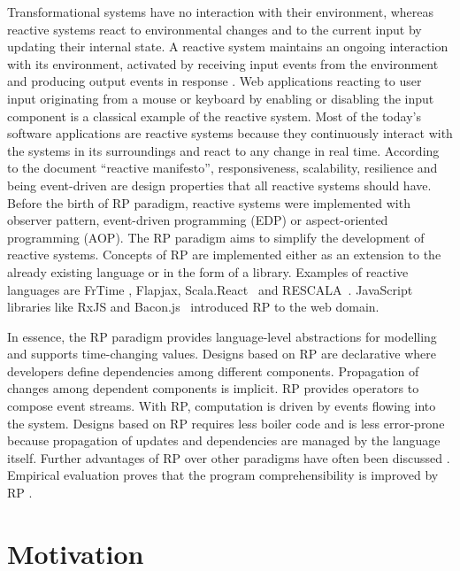 Transformational systems have no interaction with their environment, whereas reactive systems react to environmental changes and to the current input by updating their internal state. A reactive system maintains an ongoing interaction with its environment, activated by receiving input events from the environment and producing output events in response \cite{674156}. Web applications reacting to user input originating from a mouse or keyboard by enabling or disabling the input component is a classical example of the reactive system. 
Most of the today's software applications are reactive systems because they continuously interact with the systems in its surroundings and react to any change in real time. According to the document ``reactive manifesto''\cite{reactiveManifesto}, responsiveness, scalability, resilience and being event-driven are design properties that all reactive systems should have. 
Before the birth of RP paradigm, reactive systems were implemented with observer pattern, event-driven programming (EDP) or aspect-oriented programming (AOP).
The RP paradigm aims to simplify the development of reactive systems.
Concepts of RP are implemented either as an extension to the already existing language or in the form of a library. Examples of reactive languages are FrTime \cite{Cooper2006}, Flapjax\cite{Meyerovich:2009:FPL:1639949.1640091}, Scala.React~\cite{EPFL-REPORT-176887} and RESCALA~\cite{Salvaneschi:2014:RBO:2577080.2577083}. JavaScript libraries like RxJS\cite{reactivex} and Bacon.js~\cite{BaconJs} introduced RP to the web domain. 

In essence, the RP paradigm provides language-level abstractions for modelling and supports time-changing values. 
Designs based on RP are declarative where developers define dependencies among different components.
Propagation of changes among dependent components is implicit. RP provides operators to compose event streams. With RP, computation is driven by events flowing into the system.
Designs based on RP requires less boiler code and is less error-prone because propagation of updates and dependencies are managed by the language itself. Further advantages of RP over other paradigms have often been discussed \cite{Cooper2006,Meyerovich:2009:FPL:1639949.1640091,EPFL-REPORT-176887,Bainomugisha:2013:SRP:2501654.2501666}. 
Empirical evaluation proves that the program comprehensibility
is improved by RP \cite{7827078}.
\section{Motivation}

